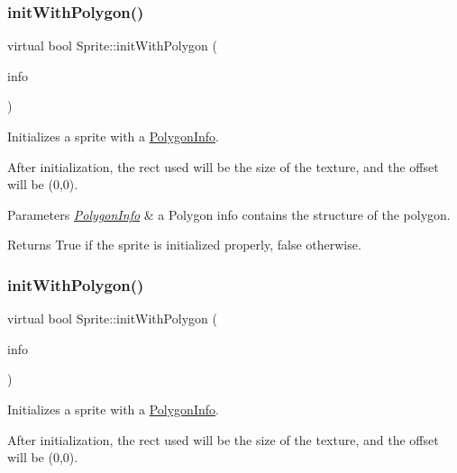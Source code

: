 \subsubsection{\texorpdfstring{init\+With\+Polygon()}{initWithPolygon()}\hspace{0.1cm}{\footnotesize\ttfamily [1/2]}}
{\footnotesize\ttfamily virtual bool Sprite\+::init\+With\+Polygon (\begin{DoxyParamCaption}\item[{const \hyperlink{classPolygonInfo}{Polygon\+Info} \&}]{info }\end{DoxyParamCaption})\hspace{0.3cm}{\ttfamily [virtual]}}

Initializes a sprite with a \hyperlink{classPolygonInfo}{Polygon\+Info}.

After initialization, the rect used will be the size of the texture, and the offset will be (0,0).


\begin{DoxyParams}{Parameters}
{\em \hyperlink{classPolygonInfo}{Polygon\+Info}} & a Polygon info contains the structure of the polygon. \\
\hline
\end{DoxyParams}
\begin{DoxyReturn}{Returns}
True if the sprite is initialized properly, false otherwise. 
\end{DoxyReturn}
\mbox{\label{classSprite_ad2f432b077c8e919ca9e20c34e8610f8}} 
\subsubsection{\texorpdfstring{init\+With\+Polygon()}{initWithPolygon()}\hspace{0.1cm}{\footnotesize\ttfamily [2/2]}}
{\footnotesize\ttfamily virtual bool Sprite\+::init\+With\+Polygon (\begin{DoxyParamCaption}\item[{const \hyperlink{classPolygonInfo}{Polygon\+Info} \&}]{info }\end{DoxyParamCaption})\hspace{0.3cm}{\ttfamily [virtual]}}

Initializes a sprite with a \hyperlink{classPolygonInfo}{Polygon\+Info}.

After initialization, the rect used will be the size of the texture, and the offset will be (0,0).



